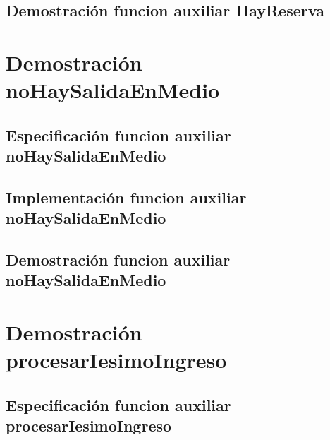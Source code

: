 \documentclass[a4paper]{article}
\begin{document}
\subsection{Demostraci\'on funcion auxiliar HayReserva}



\newpage

\section{Demostraci\'on noHaySalidaEnMedio}

\subsection{Especificaci\'on funcion auxiliar noHaySalidaEnMedio}



\subsection{Implementaci\'on funcion auxiliar noHaySalidaEnMedio}



\subsection{Demostraci\'on funcion auxiliar noHaySalidaEnMedio}



\newpage

\section{Demostraci\'on procesarIesimoIngreso}

\subsection{Especificaci\'on funcion auxiliar procesarIesimoIngreso}


\end{document}
